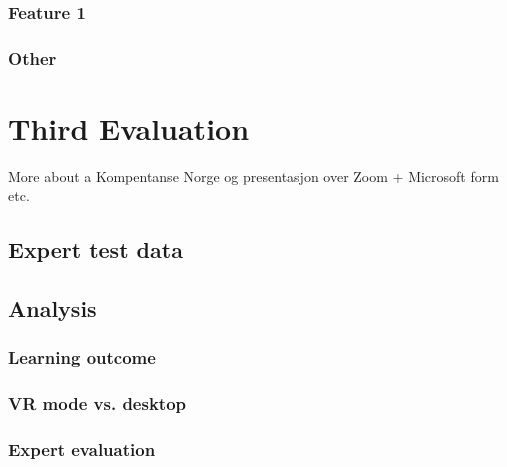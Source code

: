 \subsubsection{Feature 1}
\subsubsection{Other}


\section{Third Evaluation}
More about a Kompentanse Norge og presentasjon over Zoom + Microsoft form etc. 

\subsection{Expert test data}






\subsection{Analysis}

\subsubsection{Learning outcome}

\subsubsection{VR mode vs. desktop}

\subsubsection{Expert evaluation}


\cleardoublepage